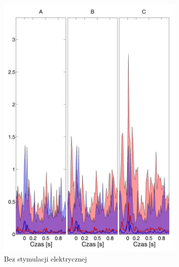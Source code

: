 \documentclass{pracamgr_2}
\begin{document}
	\begin{figure}[h]
		\begin{subfigure}{.5\textwidth}
			\centering
			\includegraphics[width=1.\linewidth]{kontrola15_20-40_z_CxC8_do_LGN82.png}
			\caption{Bez stymulacji elektrycznej}
			\label{rys:20_40_kon_CxC_LGN}
		\end{subfigure}%
		\begin{subfigure}{.5\textwidth}
			\centering

\end{subfigure}
\end{figure}
\end{document}
